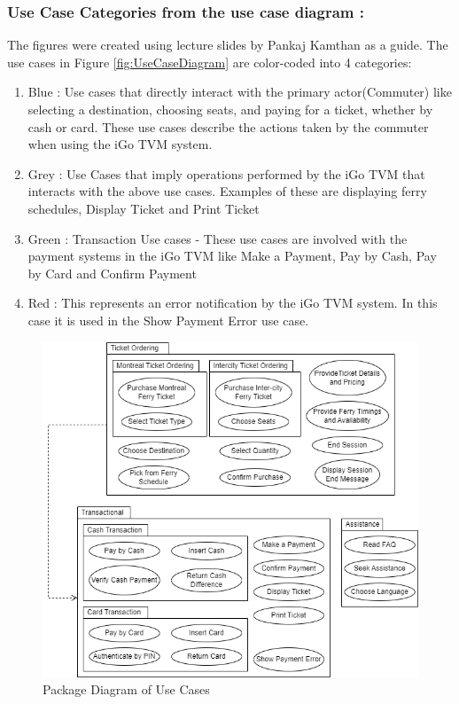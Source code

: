 \documentclass[letterpaper]{report}
\begin{document}
\subsubsection{Use Case Categories from the use case diagram :}
The figures were created using lecture slides by Pankaj Kamthan\cite{UseCaseDiagramming} as a guide.
The use cases in Figure \ref{fig:UseCaseDiagram} are color-coded into 4 categories:
\begin{enumerate}
    \item Blue : Use cases that directly interact with the primary actor(Commuter) like selecting a destination, choosing seats, and paying for a ticket, whether by cash or card. These use cases describe the actions taken by the commuter when using the iGo TVM system.
    \item Grey : Use Cases that imply operations performed by the iGo TVM that interacts with the above use cases. Examples of these are displaying ferry schedules, Display Ticket and Print Ticket
    \item Green : Transaction Use cases - These use cases are involved with the payment systems in the iGo TVM like Make a Payment, Pay by Cash, Pay by Card and Confirm Payment
    \item Red :  This represents an error notification by the iGo TVM system. In this case it is used in the Show Payment Error use case.
\end{enumerate}

\begin{figure}
    \centering
    \includegraphics[width=\textwidth]{UseCaseDiagrams/Package Diagram of Use Cases.png}
    \caption{Package Diagram of Use Cases}
    \label{fig:UseCasePackage}
\end{figure}
\end{document}
